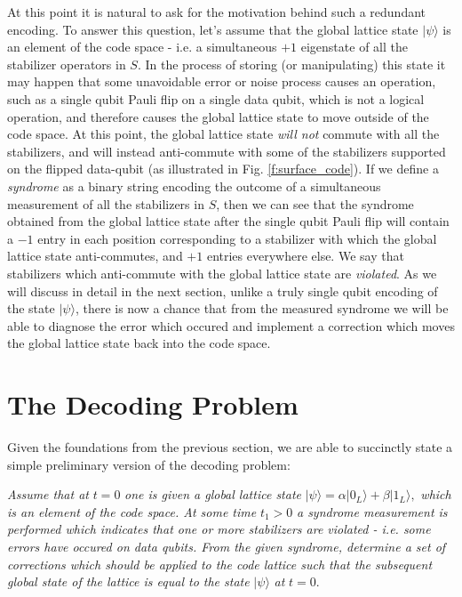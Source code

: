 \documentclass[onecolumn,preprintnumbers,amsmath,amssymb,notitlepage,nofootinbib,longbibliography,superscriptaddress,aps,pra,10pt]{revtex4-1}
\begin{document}
    At this point it is natural to ask for the motivation behind such a redundant encoding. To answer this question, let's assume that the global lattice state $|\psi\rangle$ is an element of the code space - i.e. a simultaneous $+1$ eigenstate of all the stabilizer operators in $S$. In the process of storing (or manipulating) this state it may happen that some unavoidable error or noise process causes an operation, such as a single qubit Pauli flip on a single data qubit, which is not a logical operation, and therefore causes the global lattice state to move outside of the code space. At this point, the global lattice state \textit{will not} commute with all the stabilizers, and will instead anti-commute with some of the stabilizers supported on the flipped data-qubit (as illustrated in Fig. \ref{f:surface_code}). If we define a \textit{syndrome} as a binary string encoding the outcome of a simultaneous measurement of all the stabilizers in $S$, then we can see that the syndrome obtained from the global lattice state after the single qubit Pauli flip will contain a $-1$ entry in each position corresponding to a stabilizer with which the global lattice state anti-commutes, and $+1$ entries everywhere else. We say that stabilizers which anti-commute with the global lattice state are \textit{violated}. As we will discuss in detail in the next section, unlike a truly single qubit encoding of the state $|\psi\rangle$, there is now a chance that from the measured syndrome we will be able to diagnose the error which occured and implement a correction which moves the global lattice state back into the code space. 

\section{The Decoding Problem}\label{s:the_decoding_problem}

    Given the foundations from the previous section, we are able to succinctly state a simple preliminary version of the decoding problem:\newline

    \noindent\textit{Assume that at} $t=0$  \textit{one is given a global lattice state} $|\psi\rangle = \alpha |0_L\rangle + \beta |1_L\rangle,$ \textit{which is an element of the code space. At some time }$t_1>0$ \textit{a syndrome measurement is performed which indicates that one or more stabilizers are violated - i.e. some errors have occured on data qubits. From the given syndrome, determine a set of corrections which should be applied to the code lattice such that the subsequent global state of the lattice is equal to the state} $|\psi\rangle$ \textit{at} $t=0.$\newline
\end{document}
